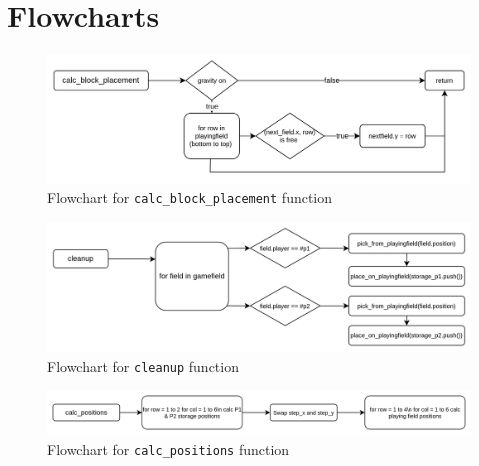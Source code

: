 \documentclass{article}
\begin{document}
    \section{Flowcharts}
        \begin{figure}[htbp]
            \centering
            \includegraphics[width=\textwidth]{../media/calc_block_placement.png}
            \caption{Flowchart for \texttt{calc\_block\_placement} function}\label{fig:calc_block_placement}
        \end{figure}

        \begin{figure}[htbp]
            \centering
            \includegraphics[width=\textwidth]{../media/cleanup.png}
            \caption{Flowchart for \texttt{cleanup} function}\label{fig:cleanup}
        \end{figure}

        \begin{figure}[htbp]
            \centering
            \includegraphics[width=\textwidth]{../media/calc_positions.png}
            \caption{Flowchart for \texttt{calc\_positions} function}\label{fig:calc_positions}
        \end{figure}
\end{document}
